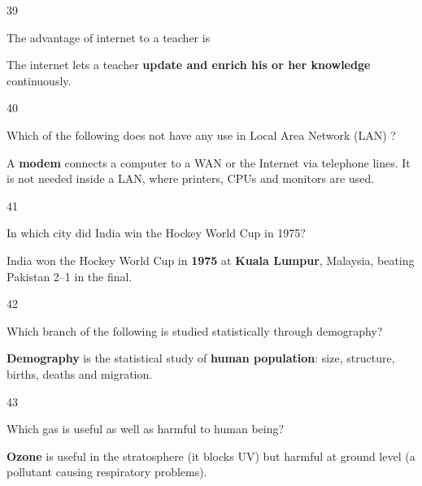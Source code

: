 \begin{question}{39}
{The advantage of internet to a teacher is\par}
\begin{explain}
The internet lets a teacher \textbf{update and enrich his or her knowledge} continuously.
\end{explain}
\end{question}

\begin{question}{40}
{Which of the following does not have any use in Local Area Network (LAN) ?\par}
\begin{explain}
A \textbf{modem} connects a computer to a WAN or the Internet via telephone lines. It is not needed inside a LAN, where printers, CPUs and monitors are used.
\end{explain}
\end{question}

\begin{question}{41}
{In which city did India win the Hockey World Cup in 1975?\par}
\begin{explain}
India won the Hockey World Cup in \textbf{1975} at \textbf{Kuala Lumpur}, Malaysia, beating Pakistan 2--1 in the final.
\end{explain}
\end{question}

\begin{question}{42}
{Which branch of the following is studied statistically through demography?\par}
\begin{explain}
\textbf{Demography} is the statistical study of \textbf{human population}: size, structure, births, deaths and migration.
\end{explain}
\end{question}

\begin{question}{43}
{Which gas is useful as well as harmful to human being?\par}
\begin{explain}
\textbf{Ozone} is useful in the stratosphere (it blocks UV) but harmful at ground level (a pollutant causing respiratory problems).
\end{explain}
\end{question}

